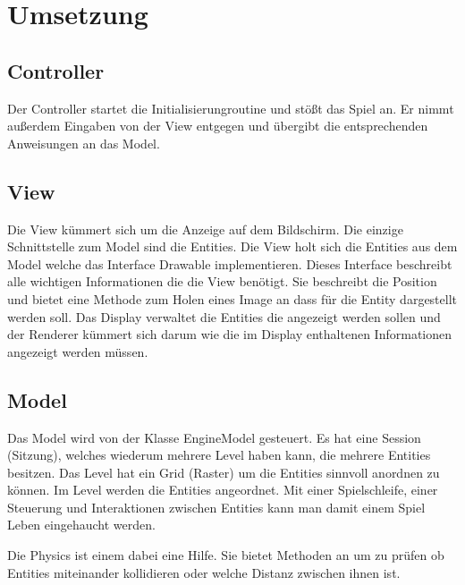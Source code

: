 \section{Umsetzung}

\subsection{Controller}

Der Controller startet die Initialisierungroutine und stößt das Spiel an. Er nimmt außerdem Eingaben von der View entgegen und übergibt die entsprechenden Anweisungen an das Model.

\subsection{View}

Die View kümmert sich um die Anzeige auf dem Bildschirm. Die einzige Schnittstelle zum Model sind die Entities. Die View holt sich die Entities aus dem Model welche das Interface Drawable implementieren. Dieses Interface beschreibt alle wichtigen Informationen die die View benötigt. Sie beschreibt die Position und bietet eine Methode zum Holen eines Image an dass für die Entity dargestellt werden soll. Das Display verwaltet die Entities die angezeigt werden sollen und der Renderer kümmert sich darum wie die im Display enthaltenen Informationen angezeigt werden müssen. 

\subsection{Model}

Das Model wird von der Klasse EngineModel gesteuert. Es hat eine Session (Sitzung), welches wiederum mehrere Level haben kann, die mehrere Entities besitzen. Das Level hat ein Grid (Raster) um die Entities sinnvoll anordnen zu können. Im Level werden die Entities angeordnet. Mit einer Spielschleife, einer Steuerung und Interaktionen zwischen Entities kann man damit einem Spiel Leben eingehaucht werden.

Die Physics ist einem dabei eine Hilfe. Sie bietet Methoden an um zu prüfen ob Entities miteinander kollidieren oder welche Distanz zwischen ihnen ist.